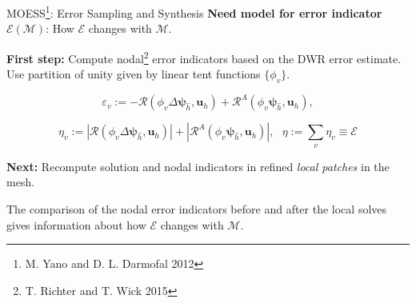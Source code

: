 \documentclass{beamer}
\newcounter{sectionframecount}
\begin{document}
\begin{frame}[t]{MOESS\footnote{M. Yano and D. L. Darmofal 2012}: Error Sampling and Synthesis}
\vspace{-5pt}
\textbf{Need model for error indicator $\mathcal{E}(\mathcal{M})$}: How $\mathcal{E}$ changes with $\mathcal{M}$.

{
\vspace{10pt}
\textbf{First step:} Compute nodal\footnote{T. Richter and T. Wick 2015} error indicators based on the DWR error estimate. Use partition of unity given by linear tent functions $\{\phi_v\}$.
}

{
\begin{equation}
  \varepsilon_v := -\mathcal{R}(\phi_v \Delta \boldsymbol{\psi}_{\hat{h}},\boldsymbol{u}_h) + \mathcal{R}^A(\phi_v\boldsymbol{\psi}_{\hat{h}},\boldsymbol{u}_h),
  \label{e:corrected_dwr_nodal}
\end{equation}

\begin{equation}
  \eta_v := |\mathcal{R}(\phi_v \Delta \boldsymbol{\psi}_{\hat{h}},\boldsymbol{u}_h)| + |\mathcal{R}^A(\phi_v\boldsymbol{\psi}_{\hat{h}},\boldsymbol{u}_h)|,~~~ \eta := \sum_{v} \eta_v \equiv \mathcal{E}
  \label{e:corrected_dwr_nodal}
\end{equation}
}

{
\textbf{Next:} Recompute solution and nodal indicators in refined \textit{local patches} in the mesh.

\vspace{5pt}
The comparison of the nodal error indicators before and after the local solves gives information about how $\mathcal{E}$ changes with $\mathcal{M}$.
}
\end{frame}

\end{document}

